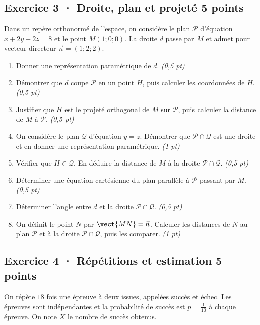 \subsection*{Exercice 3 · Droite, plan et projeté \hfill 5 points}Dans un repère orthonormé de l'espace, on considère le plan $\mathcal P$ d'équation $x+2y+2z=8$ et le point $M(1;0;0)$. La droite $d$ passe par $M$ et admet pour vecteur directeur $\vec n=(1;2;2)$.

\begin{enumerate}

\item Donner une représentation paramétrique de $d$. \hfill\textit{(0,5 pt)}

\item Démontrer que $d$ coupe $\mathcal P$ en un point $H$, puis calculer les coordonnées de $H$. \hfill\textit{(0,5 pt)}

\item Justifier que $H$ est le projeté orthogonal de $M$ sur $\mathcal P$, puis calculer la distance de $M$ à $\mathcal P$. \hfill\textit{(0,5 pt)}

\item On considère le plan $\mathcal Q$ d'équation $y=z$. Démontrer que $\mathcal P\cap\mathcal Q$ est une droite et en donner une représentation paramétrique. \hfill\textit{(1 pt)}

\item Vérifier que $H\in\mathcal Q$. En déduire la distance de $M$ à la droite $\mathcal P\cap\mathcal Q$. \hfill\textit{(0,5 pt)}

\item Déterminer une équation cartésienne du plan parallèle à $\mathcal P$ passant par $M$. \hfill\textit{(0,5 pt)}

\item Déterminer l'angle entre $d$ et la droite $\mathcal P\cap\mathcal Q$. \hfill\textit{(0,5 pt)}

\item On définit le point $N$ par $\vect{MN}=\vec n$. Calculer les distances de $N$ au plan $\mathcal P$ et à la droite $\mathcal P\cap\mathcal Q$, puis les comparer. \hfill\textit{(1 pt)}

\end{enumerate}

\subsection*{Exercice 4 · Répétitions et estimation \hfill 5 points}On répète $18$ fois une épreuve à deux issues, appelées succès et échec. Les épreuves sont indépendantes et la probabilité de succès est $p=\frac{1}{10}$ à chaque épreuve. On note $X$ le nombre de succès obtenus.


